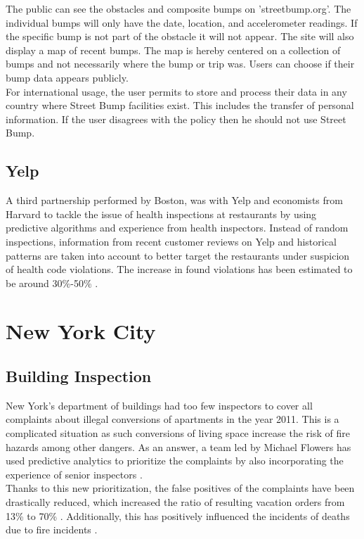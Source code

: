 \documentclass[a4paper,12pt]{report}
\begin{document}
			The public can see the obstacles and composite bumps on 'streetbump.org'. The individual bumps will only have the date, location, and accelerometer readings. 
			If the specific bump is not part of the obstacle it will not appear.
			The site will also display a map of recent bumps. 
			The map is hereby centered on a collection of bumps and not necessarily where the bump or trip was. 
			Users can choose if their bump data appears publicly.\\
			For international usage, the user permits to store and process their data in any country where Street Bump facilities exist. 
			This includes the transfer of personal information. 
			If the user disagrees with the policy then he should not use Street Bump.
		\closesection	
		
		\subsection[Yelp]{Yelp \cite{YelpBoston}}
		\startsubsection
			A third partnership performed by Boston, was with Yelp and economists from Harvard to tackle the issue of health inspections at restaurants by using predictive algorithms and experience from health inspectors.
			Instead of random inspections, information from recent customer reviews on Yelp and historical patterns are taken into account to better target the restaurants under suspicion of health code violations. 
			The increase in found violations has been estimated to be around 30\%-50\% \cite{BSL16} \cite{Gla16}.
		\closesection
	\closesection
	
	\section{New York City}
	\startsection
		\subsection{Building Inspection}
		\startsubsection
			New York's department of buildings had too few inspectors to cover all complaints about illegal conversions of apartments in the year 2011. 
			This is a complicated situation as such conversions of living space increase the risk of fire hazards among other dangers. 
			As an answer, a team led by Michael Flowers has used predictive analytics to prioritize the complaints by also incorporating the experience of senior inspectors \cite{BeyondOpenData}.\\
			Thanks to this new prioritization, the false positives of the complaints have been drastically reduced, which increased the ratio of resulting vacation orders from 13\% to 70\% \cite{PredictiveDataAnalytics}.
			Additionally, this has positively influenced the incidents of deaths due to fire incidents \cite{BigDataBigApple} \cite{FDNY}.
		\closesection
\end{document}
